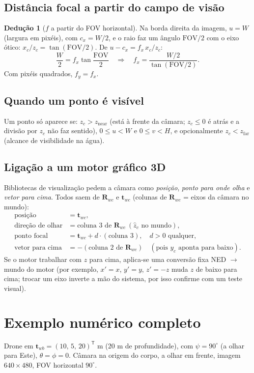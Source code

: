 \documentclass[11pt,a4paper]{article}
\newcommand{\vv}[1]{\mathbf{#1}}              %
\newcommand{\Rot}{\mathbf{R}}
\newcommand{\T}{^{\mathsf{T}}}
\theoremstyle{definition}
\newtheorem{deducao}{Dedução}[section]
\begin{document}
\subsection{Distância focal a partir do campo de visão}
\begin{deducao}[$f$ a partir do FOV horizontal]
Na borda direita da imagem, $u=W$ (largura em pixéis), com $c_x=W/2$, e o raio faz um ângulo $\mathrm{FOV}/2$ com o eixo ótico: $x_c/z_c=\tan(\mathrm{FOV}/2)$. De $u-c_x=f_x\,x_c/z_c$:
\[
\frac{W}{2}=f_x\tan\frac{\mathrm{FOV}}{2}\quad\Longrightarrow\quad
f_x=\frac{W/2}{\tan(\mathrm{FOV}/2)} .
\]
Com pixéis quadrados, $f_y=f_x$.
\end{deducao}

\subsection{Quando um ponto é visível}
Um ponto só aparece se: $z_c>z_{\text{near}}$ (está à frente da câmara; $z_c\le0$ é atrás e a divisão por $z_c$ não faz sentido), $0\le u<W$ e $0\le v<H$, e opcionalmente $z_c<z_{\text{far}}$ (alcance de visibilidade na água).

\subsection{Ligação a um motor gráfico 3D}
Bibliotecas de visualização pedem a câmara como \emph{posição}, \emph{ponto para onde olha} e \emph{vetor para cima}. Todos saem de $\Rot_{wc}$ e $\vv{t}_{wc}$ (colunas de $\Rot_{wc}$ = eixos da câmara no mundo):
\begin{align*}
\text{posição}&=\vv{t}_{wc},\\
\text{direção de olhar}&=\text{coluna 3 de }\Rot_{wc}\ (\hat{z}_c\text{ no mundo}),\\
\text{ponto focal}&=\vv{t}_{wc}+d\cdot(\text{coluna 3}),\quad d>0\text{ qualquer},\\
\text{vetor para cima}&=-(\text{coluna 2 de }\Rot_{wc})\quad(\text{pois } y_c \text{ aponta para baixo}).
\end{align*}
Se o motor trabalhar com $z$ para cima, aplica-se uma conversão fixa NED $\to$ mundo do motor (por exemplo, $x'=x$, $y'=y$, $z'=-z$ muda $z$ de baixo para cima; trocar um eixo inverte a mão do sistema, por isso confirme com um teste visual).

\section{Exemplo numérico completo}
Drone em $\vv{t}_{wb}=(10,\,5,\,20)\T$ m (20 m de profundidade), com $\psi=90^\circ$ (a olhar para Este), $\theta=\phi=0$. Câmara na origem do corpo, a olhar em frente, imagem $640\times480$, FOV horizontal $90^\circ$.
\end{document}
